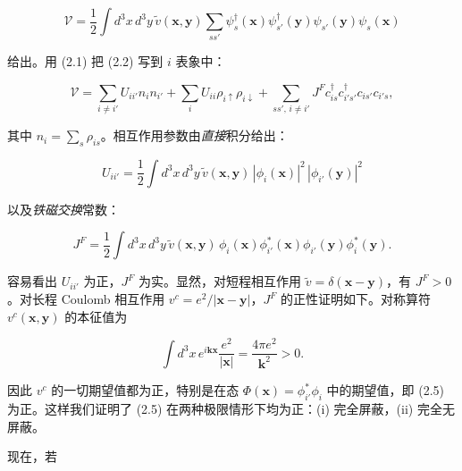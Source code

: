 \begin{equation*}
\mathcal {V} = \frac {1}{2} \int d ^ {3} x \, d ^ {3} y \, \tilde {v} (\mathbf {x}, \mathbf {y}) \sum_ {ss'} \psi_ {s} ^ {\dagger} (\mathbf {x}) \psi_ {s '} ^ {\dagger} (\mathbf {y}) \psi_ {s '} (\mathbf {y}) \psi_ {s} (\mathbf {x})
\tag{2.2}
\end{equation*}

给出。用 (2.1) 把 (2.2) 写到 $i$ 表象中：

\begin{equation*}
\mathcal {V} = \sum_ {i \neq i'} U _ {ii'} n _ {i} n _ {i'} + \sum_ {i} U _ {ii} \rho_ {i \uparrow} \rho_ {i \downarrow} + \sum_ {ss',\, i \neq i'} J ^ {F} c _ {is} ^ {\dagger} c _ {i's'} ^ {\dagger} c _ {is'} c _ {i's},
\tag{2.3}
\end{equation*}

其中 $n_i = \sum_s \rho_{is}$。相互作用参数由\emph{直接}积分给出：

\begin{equation*}
U _ {ii'} = \frac {1}{2} \int d ^ {3} x \, d ^ {3} y \, \tilde {v} (\mathbf {x}, \mathbf {y}) \, | \phi_ {i} (\mathbf {x}) | ^ {2} \, | \phi_ {i'} (\mathbf {y}) | ^ {2}
\tag{2.4}
\end{equation*}

以及\emph{铁磁交换}常数：

\begin{equation*}
J ^ {F} = \frac {1}{2} \int d ^ {3} x \, d ^ {3} y \, \tilde {v} (\mathbf {x}, \mathbf {y}) \, \phi_ {i} (\mathbf {x}) \phi_ {i'} ^ {*} (\mathbf {x}) \phi_ {i'} (\mathbf {y}) \phi_ {i} ^ {*} (\mathbf {y}).
\tag{2.5}
\end{equation*}

容易看出 $U_{ii'}$ 为正，$J^{F}$ 为实。显然，对短程相互作用 $\tilde{v} = \delta(\mathbf{x} - \mathbf{y})$，有 $J^{F} > 0$。对长程 Coulomb 相互作用 $v^{c} = e^{2}/|\mathbf{x} - \mathbf{y}|$，$J^{F}$ 的正性证明如下。对称算符 $v^{c}(\mathbf{x}, \mathbf{y})$ 的本征值为

\begin{equation*}
\int d ^ {3} x \, e ^ {i \mathbf {kx}} \frac {e ^ {2}}{| \mathbf {x} |} = \frac {4 \pi e ^ {2}}{\mathbf {k} ^ {2}} > 0.
\tag{2.6}
\end{equation*}

因此 $v^{c}$ 的一切期望值都为正，特别是在态 $\Phi(\mathbf{x}) = \phi_{i'}^{*}\phi_{i}$ 中的期望值，即 (2.5) 为正。这样我们证明了 (2.5) 在两种极限情形下均为正：(i) 完全屏蔽，(ii) 完全无屏蔽。

现在，若

